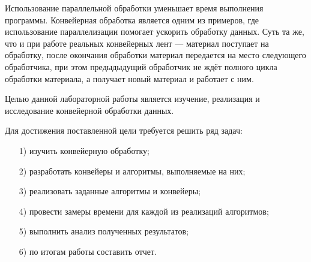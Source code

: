 

Использование параллельной обработки уменьшает время выполнения программы. Конвейерная обработка является одним из примеров, где использование параллелизации помогает ускорить обработку данных. Суть та же, что и при работе реальных конвейерных лент ---
материал поступает на обработку, после окончания обработки материал передается на место следующего обработчика, при этом предыдыдущий
обработчик не ждёт полного цикла обработки материала, а получает новый
материал и работает с ним.

Целью данной лабораторной работы является изучение, реализация и исследование конвейерной обработки данных.

Для достижения поставленной цели требуется решить ряд задач:
\begin{enumerate}
	\item[1)] изучить конвейерную обработку;
	\item[2)] разработать конвейеры и алгоритмы, выполняемые на них;
	\item[3)] реализовать заданные алгоритмы и конвейеры;
	\item[4)] провести замеры времени для каждой из реализаций алгоритмов;
 	\item[5)] выполнить анализ полученных результатов;
	\item[6)] по итогам работы составить отчет.
\end{enumerate}

\newpage

